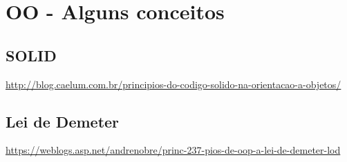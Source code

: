 \chapter{OO - Alguns conceitos}

\section{SOLID}

\url{http://blog.caelum.com.br/principios-do-codigo-solido-na-orientacao-a-objetos/}

\section{Lei de Demeter}

\url{https://weblogs.asp.net/andrenobre/princ-237-pios-de-oop-a-lei-de-demeter-lod}
